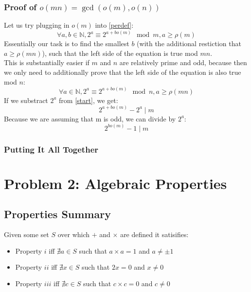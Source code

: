 \documentclass{article}
\begin{document}
  \subsubsection{Proof of $o(mn) = \gcd(o(m), o(n))$}
  Let us try plugging in $o(m)$ into \eqref{perdef}:
  \begin{equation}\label{start}
    \forall a, b \in \mathbb{N}, 2^a \equiv 2^{a+bo(m)} \mod m, a \geq \rho(m)
  \end{equation}
  Essentially our task is to find the smallest $b$ (with the additional restiction that $a \geq \rho(mn)$), such that the left side of the equation is true mod $mn$.\\ 

  This is substantially easier if $m$ and $n$ are relatively prime and odd, because then we only need to additionally prove that the left side of the equation is also true mod $n$:
  \begin{equation}
    \forall a \in \mathbb{N}, 2^a \equiv 2^{a + bo(m)} \mod n, a \geq \rho(mn)
  \end{equation}
  If we substract $2^a$ from \eqref{start}, we get:
  \begin{equation}
    2^{a+bo(m)} - 2^a \mid m 
  \end{equation}
  Because we are assuming that m is odd, we can divide by $2^a$:
  \begin{equation}
    2^{bo(m)} - 1 \mid m
  \end{equation}

  \subsubsection{Putting It All Together}
  \section{Problem 2: Algebraic Properties}
  \subsection{Properties Summary}
  Given some set $S$ over which $+$ and $\times$ are defined it satisifies:
  \begin{itemize}
  \item Property $i$ iff $\nexists a \in S$ such that $a \times a = 1$ and $a \neq \pm 1$
  \item Property $ii$ iff $\nexists x \in S$ such that $2x = 0$ and $x \neq 0$
  \item Property $iii$ iff $\nexists c \in S$ such that $c \times c = 0$ and $c \neq 0$
  \end{itemize}
\end{document}
